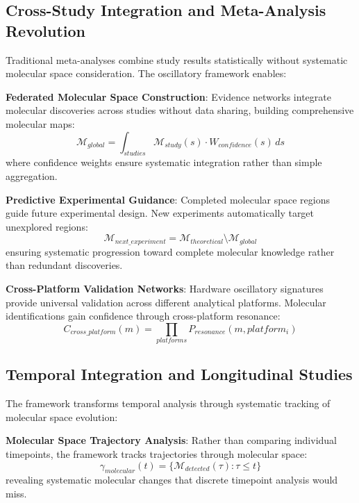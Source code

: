 \documentclass[11pt,a4paper]{article}
\begin{document}
\subsection{Cross-Study Integration and Meta-Analysis Revolution}

Traditional meta-analyses combine study results statistically without systematic molecular space consideration. The oscillatory framework enables:

\textbf{Federated Molecular Space Construction}: Evidence networks integrate molecular discoveries across studies without data sharing, building comprehensive molecular maps:
\begin{equation}
\mathcal{M}_{global} = \int_{studies} \mathcal{M}_{study}(s) \cdot W_{confidence}(s) \, ds
\end{equation}
where confidence weights ensure systematic integration rather than simple aggregation.

\textbf{Predictive Experimental Guidance}: Completed molecular space regions guide future experimental design. New experiments automatically target unexplored regions:
\begin{equation}
\mathcal{M}_{next\_experiment} = \mathcal{M}_{theoretical} \setminus \mathcal{M}_{global}
\end{equation}
ensuring systematic progression toward complete molecular knowledge rather than redundant discoveries.

\textbf{Cross-Platform Validation Networks}: Hardware oscillatory signatures provide universal validation across different analytical platforms. Molecular identifications gain confidence through cross-platform resonance:
\begin{equation}
C_{cross\_platform}(m) = \prod_{platforms} P_{resonance}(m, platform_i)
\end{equation}

\subsection{Temporal Integration and Longitudinal Studies}

The framework transforms temporal analysis through systematic tracking of molecular space evolution:

\textbf{Molecular Space Trajectory Analysis}: Rather than comparing individual timepoints, the framework tracks trajectories through molecular space:
\begin{equation}
\gamma_{molecular}(t) = \{\mathcal{M}_{detected}(\tau) : \tau \leq t\}
\end{equation}
revealing systematic molecular changes that discrete timepoint analysis would miss.
\end{document}
